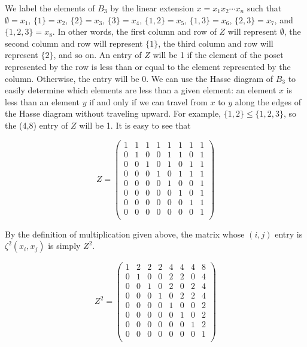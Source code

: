 \documentclass{article} %
\theoremstyle{definition}
\theoremstyle{plain}
\begin{document}
We label the elements of $B_3$ by the linear extension $x=x_1x_2\cdots x_n$ such that $\emptyset=x_1$, $\{1\}=x_2$, $\{2\}=x_3$, $\{3\}=x_4$, $\{1,2\}=x_5$, $\{1,3\}=x_6$, $\{2,3\}=x_7$, and $\{1,2,3\}=x_8$.
In other words, the first column and row of $Z$ will represent $\emptyset$, the second column and row will represent $\{1\}$, the third column and row will represent $\{2\}$, and so on. An entry of $Z$ will be 1 if the element of the poset represented by the row is less than or equal to the element represented by the column. Otherwise, the entry will be 0. We can use the Hasse diagram of $B_3$ to easily determine which elements are less than a given element: an element $x$ is less than an element $y$ if and only if we can travel from $x$ to $y$ along the edges of the Hasse diagram without traveling upward. For example, $\{1,2\} \leq \{1,2,3\}$, so the (4,8) entry of $Z$ will be 1. It is easy to see that

\begin{displaymath}
Z=
\begin{pmatrix}
1 & 1 & 1 & 1 & 1 & 1 & 1 & 1 \\
0 & 1 & 0 & 0 & 1 & 1 & 0 & 1 \\
0 & 0 & 1 & 0 & 1 & 0 & 1 & 1 \\
0 & 0 & 0 & 1 & 0 & 1 & 1 & 1 \\
0 & 0 & 0 & 0 & 1 & 0 & 0 & 1 \\
0 & 0 & 0 & 0 & 0 & 1 & 0 & 1 \\
0 & 0 & 0 & 0 & 0 & 0 & 1 & 1 \\
0 & 0 & 0 & 0 & 0 & 0 & 0 & 1 \\
\end{pmatrix}
\end{displaymath}

By the definition of multiplication given above, the matrix whose $(i,j)$ entry is $\zeta^2(x_i,x_j)$ is simply $Z^2$.

\begin{displaymath}
Z^2=
\begin{pmatrix}
1 & 2 & 2 & 2 & 4 & 4 & 4 & 8 \\
0 & 1 & 0 & 0 & 2 & 2 & 0 & 4 \\
0 & 0 & 1 & 0 & 2 & 0 & 2 & 4 \\
0 & 0 & 0 & 1 & 0 & 2 & 2 & 4 \\
0 & 0 & 0 & 0 & 1 & 0 & 0 & 2 \\
0 & 0 & 0 & 0 & 0 & 1 & 0 & 2 \\
0 & 0 & 0 & 0 & 0 & 0 & 1 & 2 \\
0 & 0 & 0 & 0 & 0 & 0 & 0 & 1 \\
\end{pmatrix}
\end{displaymath}
\end{document}
